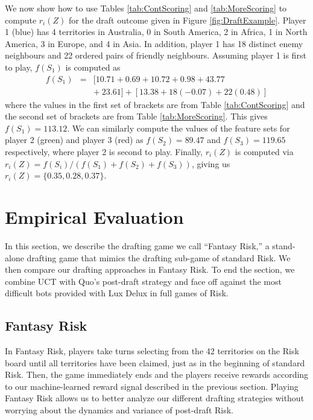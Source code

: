 \documentclass[letterpaper]{article}
\numberwithin{equation}{section}
\numberwithin{theorem}{section}
\numberwithin{lemma}{section}
\numberwithin{df}{section}
\begin{document}
We now show how to use Tables \ref{tab:ContScoring} and \ref{tab:MoreScoring} to compute $r_i(Z)$ for the draft outcome given in Figure \ref{fig:DraftExample}.  Player 1 (blue) has 4 territories in Australia, 0 in South America, 2 in Africa, 1 in North America, 3 in Europe, and 4 in Asia.  In addition, player 1 has 18 distinct enemy neighbours and 22 ordered pairs of friendly neighbours.  Assuming player 1 is first to play, $f(S_1)$ is computed as
\begin{eqnarray*}
 	f(S_1) &=& [10.71 + 0.69 + 10.72 + 0.98 + 43.77 \\ &&+\ 23.61] + [13.38 + 18(-0.07) + 22(0.48)] %
\end{eqnarray*}
where the values in the first set of brackets are from Table \ref{tab:ContScoring} and the second set of brackets are from Table \ref{tab:MoreScoring}.  This gives $f(S_1) = 113.12$.  We can similarly compute the values of the feature sets for player 2 (green) and player 3 (red) as %
$f(S_2) = 89.47$ and $f(S_3) = 119.65$ respectively, where player 2 is second to play.  Finally, $r_i(Z)$ is computed via $r_i(Z) = f(S_i) / \left(f(S_1) + f(S_2) + f(S_3) \right)$, giving us %
$r_i(Z) = \{0.35, 0.28, 0.37\}$.

\section{Empirical Evaluation}

In this section, we describe the drafting game we call ``Fantasy Risk,'' a stand-alone drafting game that mimics the drafting sub-game of standard Risk.  We then compare our drafting approaches in Fantasy Risk.  To end the section, we combine UCT with Quo's post-draft strategy and face off against the most difficult bots provided with Lux Delux in full games of Risk.

\subsection{Fantasy Risk}

In Fantasy Risk, players take turns selecting from the 42 territories on the Risk board until all territories have been claimed, just as in the beginning of standard Risk.  Then, the game immediately ends and the players receive rewards according to our machine-learned reward signal described in the previous section.  Playing Fantasy Risk allows us to better analyze our different drafting strategies without worrying about the dynamics and variance of post-draft Risk.  
\end{document}
